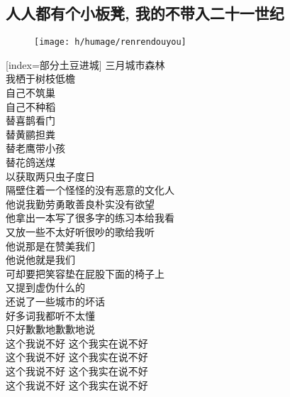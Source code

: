 
	

\subsection{人人都有个小板凳, 我的不带入二十一世纪}

\begin{figure}[htp]
	\begin{center}
	  \texttt{[image: h/humage/renrendouyou]}
	  \label{fig:renrendouyou}
	\end{center}
\end{figure}

\begin{songs}{}
  [index={部分土豆进城}]
	三月城市森林	\\
	我栖于树枝低檐	\\
	自己不筑巢	\\
	自己不种稻	\\
	替喜鹊看门	\\
	替黄鹂担粪	\\
	替老鹰带小孩	\\
	替花鸽送煤	\\
	以获取两只虫子度日	\\
	\vspace{2ex}
	隔壁住着一个怪怪的没有恶意的文化人	\\
	他说我勤劳勇敢善良朴实没有欲望	\\
	他拿出一本写了很多字的练习本给我看	\\
	又放一些不太好听很吵的歌给我听	\\
	他说那是在赞美我们	\\
	他说他就是我们	\\
	可却要把笑容垫在屁股下面的椅子上	\\
	又提到虚伪什么的	\\
	还说了一些城市的坏话	\\
	好多词我都听不太懂	\\
	只好歉歉地歉歉地说	\\
	这个我说不好 \hspace{5mm} 这个我实在说不好	\\
	这个我说不好 \hspace{5mm} 这个我实在说不好	\\
	这个我说不好 \hspace{5mm} 这个我实在说不好	\\
	这个我说不好 \hspace{5mm} 这个我实在说不好	\\

\end{songs}
